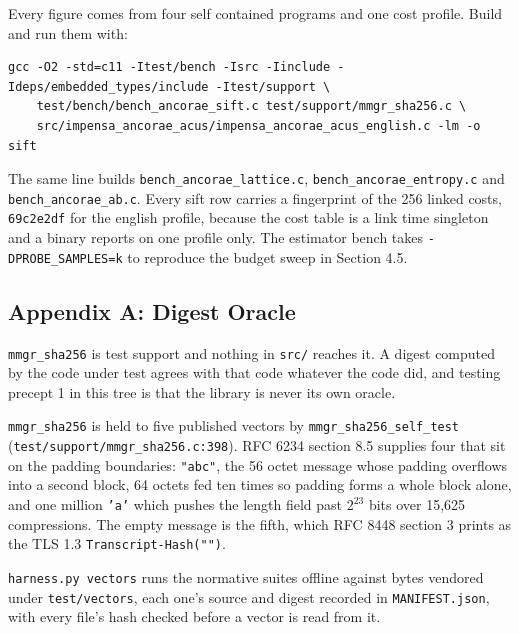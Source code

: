 Every figure comes from four self contained programs and one cost profile. Build and run them with:

\begin{lstlisting}[breaklines=true,breakatwhitespace=false,basicstyle=\ttfamily\small]
gcc -O2 -std=c11 -Itest/bench -Isrc -Iinclude -Ideps/embedded_types/include -Itest/support \
    test/bench/bench_ancorae_sift.c test/support/mmgr_sha256.c \
    src/impensa_ancorae_acus/impensa_ancorae_acus_english.c -lm -o sift
\end{lstlisting}

The same line builds \texttt{bench\_\allowbreak{}ancorae\_\allowbreak{}lattice.\allowbreak{}c}, \texttt{bench\_\allowbreak{}ancorae\_\allowbreak{}entropy.\allowbreak{}c} and \texttt{bench\_\allowbreak{}ancorae\_\allowbreak{}ab.\allowbreak{}c}. Every sift row carries a fingerprint of the 256 linked costs, \texttt{69c2e2df} for the english profile, because the cost table is a link time singleton and a binary reports on one profile only. The estimator bench takes \texttt{-\allowbreak{}DPROBE\_\allowbreak{}SAMPLES=k} to reproduce the budget sweep in Section 4.5.

\subsection{Appendix A: Digest Oracle}

\texttt{mmgr\_\allowbreak{}sha256} is test support and nothing in \texttt{src/\allowbreak{}} reaches it. A digest computed by the code under test agrees with that code whatever the code did, and testing precept 1 in this tree is that the library is never its own oracle.

\texttt{mmgr\_\allowbreak{}sha256} is held to five published vectors by \texttt{mmgr\_\allowbreak{}sha256\_\allowbreak{}self\_\allowbreak{}test} (\texttt{test/\allowbreak{}support/\allowbreak{}mmgr\_\allowbreak{}sha256.\allowbreak{}c:398}). RFC 6234 section 8.5 supplies four that sit on the padding boundaries: \texttt{"abc"}, the 56 octet message whose padding overflows into a second block, 64 octets fed ten times so padding forms a whole block alone, and one million \texttt{'a'} which pushes the length field past \(2^{23}\) bits over 15,625 compressions. The empty message is the fifth, which RFC 8448 section 3 prints as the TLS 1.3 \texttt{Transcript-\allowbreak{}Hash("")}.

\texttt{harness.\allowbreak{}py vectors} runs the normative suites offline against bytes vendored under \texttt{test/\allowbreak{}vectors}, each one's source and digest recorded in \texttt{MANIFEST.\allowbreak{}json}, with every file's hash checked before a vector is read from it.

